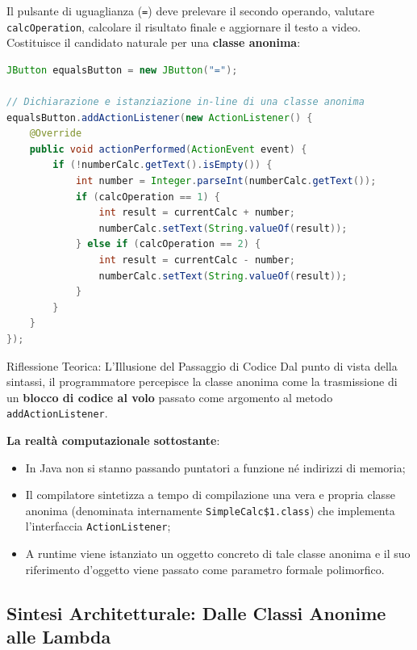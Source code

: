 \documentclass[12pt]{extarticle}
\begin{document}
\noindent Il pulsante di uguaglianza (\texttt{=}) deve prelevare il secondo operando, valutare \texttt{calcOperation}, calcolare il risultato finale e aggiornare il testo a video. Costituisce il candidato naturale per una \textbf{classe anonima}:
\begin{lstlisting}[language=Java]
JButton equalsButton = new JButton("=");

// Dichiarazione e istanziazione in-line di una classe anonima
equalsButton.addActionListener(new ActionListener() {
    @Override
    public void actionPerformed(ActionEvent event) {
        if (!numberCalc.getText().isEmpty()) {
            int number = Integer.parseInt(numberCalc.getText());
            if (calcOperation == 1) {
                int result = currentCalc + number;
                numberCalc.setText(String.valueOf(result));
            } else if (calcOperation == 2) {
                int result = currentCalc - number;
                numberCalc.setText(String.valueOf(result));
            }
        }
    }
});
\end{lstlisting}

\begin{cbox}{Riflessione Teorica: L'Illusione del Passaggio di Codice}
Dal punto di vista della sintassi, il programmatore percepisce la classe anonima come la trasmissione di un \textbf{blocco di codice al volo} passato come argomento al metodo \texttt{addActionListener}.

\medskip
\noindent \textbf{La realtà computazionale sottostante}:
\begin{itemize}
    \item In Java non si stanno passando puntatori a funzione né indirizzi di memoria;
    \item Il compilatore sintetizza a tempo di compilazione una vera e propria classe anonima (denominata internamente \texttt{SimpleCalc\$1.class}) che implementa l'interfaccia \texttt{ActionListener};
    \item A runtime viene istanziato un oggetto concreto di tale classe anonima e il suo riferimento d'oggetto viene passato come parametro formale polimorfico.
\end{itemize}
\end{cbox}

\subsection{Sintesi Architetturale: Dalle Classi Anonime alle Lambda}
\end{document}
